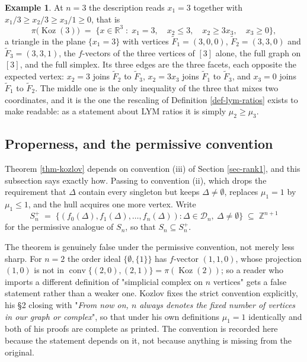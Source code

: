\documentclass[11pt, a4paper, abstract=yes]{scrartcl}
\theoremstyle{definition}
\newtheorem{mexample}[definition]{Example}
\theoremstyle{remark}
\theoremstyle{plain}
\newcommand{\Koz}{\operatorname{Koz}}
\newcommand{\proj}{\pi}
\newcommand{\conv}{\operatorname{conv}}
\begin{document}
\begin{mexample}
At \(n=3\) the description reads \(x_1=3\) together with
\(x_1/3\ge x_2/3\ge x_3/1\ge0\), that is
\begin{equation}\label{eq:facets-ex}
  \proj\bigl(\Koz(3)\bigr)\;=\;\bigl\lbrace x\in\mathbb R^3\;:\;x_1=3,\quad
     x_2\le3,\quad x_2\ge3x_3,\quad x_3\ge0\bigr\rbrace ,
\end{equation}
a triangle in the plane \(\lbrace x_1=3\rbrace\) with vertices
\(\tilde F_1=(3,0,0)\), \(\tilde F_2=(3,3,0)\) and \(\tilde F_3=(3,3,1)\), the \(f\)-vectors of the
three vertices of \([3]\) alone, the full graph on \([3]\), and the full simplex. Its three edges are
the three facets, each opposite the expected vertex: \(x_2=3\) joins \(\tilde F_2\) to
\(\tilde F_3\), \(x_2=3x_3\) joins \(\tilde F_1\) to \(\tilde F_3\), and \(x_3=0\) joins
\(\tilde F_1\) to \(\tilde F_2\). The middle one is the only inequality of the three that mixes two
coordinates, and it is the one the rescaling of Definition \ref{def-lym-ratios} exists to make
readable: as a statement about LYM ratios it is simply \(\mu_2\ge\mu_3\).
\label{ex-facets}
\end{mexample}
\subsection{Properness, and the permissive convention}
\label{sec-permissive}
Theorem \ref{thm-kozlov} depends on convention (iii) of Section \ref{sec-rank1}, and this subsection says
exactly how. Passing to convention (ii), which drops the requirement that \(\Delta\) contain every
singleton but keeps \(\Delta\ne\emptyset\), replaces \(\mu_1=1\) by \(\mu_1\le1\), and the hull
acquires one more vertex. Write
\begin{equation}\label{eq:Splus}
  S_n^{+}\;=\;\bigl\lbrace(f_0(\Delta),f_1(\Delta),\dots,f_n(\Delta)):
    \Delta\in\mathcal D_n,\ \Delta\ne\emptyset\bigr\rbrace\;\subseteq\;\mathbb Z^{n+1}
\end{equation}
for the permissive analogue of \(S_n\), so that \(S_n\subseteq S_n^{+}\).

The theorem is genuinely false under the permissive convention, not merely less sharp. For \(n=2\) the
order ideal \(\lbrace\emptyset,\lbrace1\rbrace\rbrace\) has \(f\)-vector \((1,1,0)\), whose projection
\((1,0)\) is not in \(\conv\lbrace(2,0),(2,1)\rbrace=\proj(\Koz(2))\); so a reader who imports a
different definition of "simplicial complex on \(n\) vertices" gets a false statement rather than a
weaker one. Kozlov fixes the strict convention explicitly, his §2 closing with "\emph{From now on, \(n\)
always denotes the fixed number of vertices in our graph or complex}", so that under his own
definitions \(\mu_1=1\) identically and both of his proofs are complete as printed. The convention is recorded
here because the statement depends on it, not because anything is missing from the original.
\end{document}
